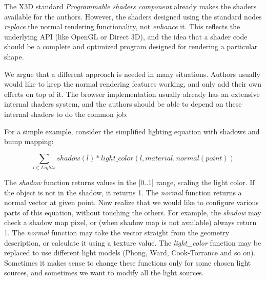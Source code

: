 \documentclass{acmsiggraph}                     %
\begin{document}
The X3D standard \textit{Programmable shaders component} already makes
the shaders available for the authors. However, the shaders designed using
the standard nodes
\textit{replace} the normal rendering functionality, not \textit{enhance} it.
This reflects the underlying API (like OpenGL or Direct 3D),
and the idea that a shader code should be a complete and optimized program
designed for rendering a particular shape.

We argue that a different approach is needed in many situations.
Authors usually would like to keep the normal rendering features working,
and only add their own effects on top of it. The browser
implementation usually already has an extensive internal shaders system,
and the authors should be able to depend on these internal shaders
to do the common job.

For a simple example, consider the simplified lighting equation with shadows
and bump mapping:

$$ \sum_{l\in Lights} shadow(l) * light\_color(l, material, normal(point)) $$

The \textit{shadow} function returns values in the [0..1] range,
scaling the light color. If the object is not in the shadow, it returns 1.
The \textit{normal} function returns a normal vector at given point.
Now realize that we would like to configure various parts of this equation,
without touching the others.
For example, the \textit{shadow} may check a shadow map pixel,
or (when shadow map is not available) always return 1.
The \textit{normal} function may take the vector straight from
the geometry description, or calculate it using a texture value.
The \textit{light\_color} function may be replaced to use different
light models (Phong, Ward, Cook-Torrance and so on). Sometimes it makes sense
to change these functions only for some chosen light sources, and sometimes
we want to modify all the light sources.
\end{document}
